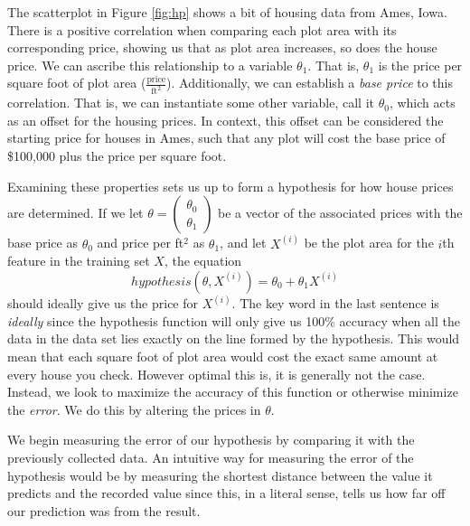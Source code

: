 \documentclass{book}[a5paper]
\begin{document}
The scatterplot in Figure \ref{fig:hp} shows a bit of housing data from Ames,
Iowa. There is a positive correlation when comparing each plot area with its
corresponding price, showing us that as plot area increases, so does the house
price. We can ascribe this relationship to a variable $\theta_1$. That is,
$\theta_1$ is the price per square foot of plot area
($\frac{\text{price}}{\text{ft}^2}$). Additionally, we can establish a
\emph{base price} to this correlation. That is, we can instantiate some other
variable, call it $\theta_0$, which acts as an offset for the housing prices. In
context, this offset can be considered the starting price for houses in Ames,
such that any plot will cost the base price of \$100,000 plus the price per
square foot.

Examining these properties sets us up to form a hypothesis for how house prices
are determined.  If we let $\theta = \begin{pmatrix}\theta_0 \\
\theta_1\end{pmatrix}$ be a vector of the associated prices with the base price
as $\theta_0$ and price per ft$^2$ as $\theta_1$, and let $X^{(i)}$ be the plot
area for the $i$th feature in the training set $X$, the equation
\begin{equation}
    hypothesis(\theta, X^{(i)}) = \theta_0 + \theta_1X^{(i)}
\end{equation}
should ideally give us the price for $X^{(i)}$. The key word in the last
sentence is \emph{ideally} since the hypothesis function will only give us 100\%
accuracy when all the data in the data set lies exactly on the line formed by
the hypothesis. This would mean that each square foot of plot area would cost
the exact same amount at every house you check. However optimal this is, it is
generally not the case. Instead, we look to maximize the accuracy of this
function or otherwise minimize the \emph{error}. We do this by altering the
prices in $\theta$.


We begin measuring the error of our hypothesis by comparing it with the
previously collected data.  An intuitive way for measuring the  error of the
hypothesis would be by measuring the shortest distance between the value it
predicts and the recorded value since this, in a literal sense, tells us how far
off our prediction was from the result. 
\end{document}
